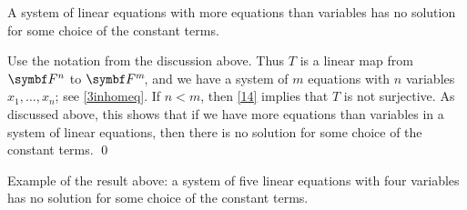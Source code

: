 {A system of linear equations with more equations than variables has no solution for some choice of the constant terms.}

\proof
Use the notation from the discussion above. Thus $T$ is a linear map from $\F{n}$ to $\FF{m}$, and we have a system of $m$ equations with $n$ variables $x_1, \dots, x_n$; see \ref{3inhomeq}. If $n \lt m$, then \ref{14} implies that $T$ is not surjective. As discussed above, this shows that if we have more equations than variables in a system of linear equations, then there is no solution for some choice of the constant terms.
\qed

Example of the result above: a system of five linear equations with four variables has no solution for some choice of the constant terms.

